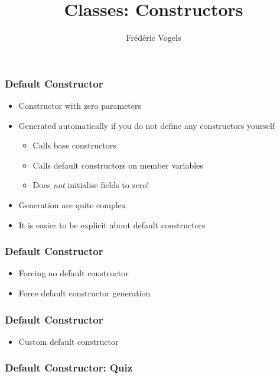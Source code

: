 \documentclass{../ucll-slides}
\title{Classes: Constructors}
\author{Fr\'ed\'eric Vogels}
\begin{document}
\begin{frame}
  \titlepage
\end{frame}

\begin{frame}
  \frametitle{Default Constructor}
  \begin{itemize}
    \item Constructor with zero parameters
    \item Generated automatically if you do not define any constructors yourself
          \begin{itemize}
            \item Calls base constructors
            \item Calls default constructors on member variables
            \item Does \emph{not} initialise fields to zero!
          \end{itemize}
    \item Generation  are quite complex
    \item It is easier to be explicit about default constructors
  \end{itemize}
\end{frame}

\begin{frame}
  \frametitle{Default Constructor}
  \begin{itemize}
    \item Forcing no default constructor
          \vskip1mm
    \item Force default constructor generation
          \vskip1mm
  \end{itemize}
\end{frame}

\begin{frame}
  \frametitle{Default Constructor}
  \begin{itemize}
    \item Custom default constructor
          \vskip1mm
  \end{itemize}
\end{frame}

\begin{frame}
  \frametitle{Default Constructor: Quiz}
\end{frame}
\end{document}
